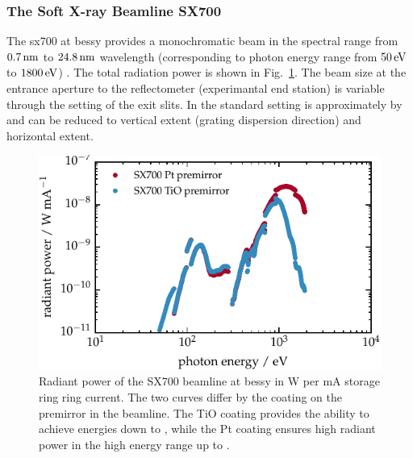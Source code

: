 \subsubsection{The Soft X-ray Beamline SX700}
The \gls{sx700} at \gls{bessy} provides a monochromatic beam in the spectral range from $\nm{0.7}$ to $\nm{24.8}$ wavelength (corresponding to photon energy range from $\ev{50}$ to $\ev{1800}$) \cite{beckhoff_quarter-century_2009}. The total radiation power is shown in Fig.~\ref{ch_exp:fig_flux_sx700}. The beam size at the entrance aperture to the reflectometer (experimantal end station) is variable through the setting of the exit slits. In the standard setting is approximately  by  \cite{scholze_high-accuracy_2001} and can be reduced to  vertical extent (grating dispersion direction) and  horizontal extent.
\begin{figure}[htb]
    \includegraphics{img/beamline_radiant_power.pdf}
    \caption[Radiant power of the SX700 beamline.]{Radiant power of the SX700 beamline at \gls{bessy} in W per mA storage ring ring current. The two curves differ by the coating on the premirror in the beamline. The TiO coating provides the ability to achieve energies down to , while the Pt coating ensures high radiant power in the high energy range up to .}
    \label{ch_exp:fig_flux_sx700}
\end{figure}


